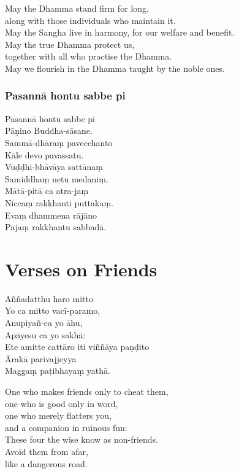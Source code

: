 \begin{english}
  May the Dhamma stand firm for long,\\
  along with those individuals who maintain it.\\
  May the Sangha live in harmony, for our welfare and benefit.\\
  May the true Dhamma protect us,\\
  together with all who practise the Dhamma.\\
  May we flourish in the Dhamma taught by the noble ones.
\end{english}

\subsubsection{Pasannā hontu sabbe pi}


Pasannā hontu sabbe pi\\
Pāṇino Buddha-sāsane.\\
Sammā-dhāraṃ pavecchanto\\
Kāle devo pavassatu.\\
Vuḍḍhi-bhāvāya sattānaṃ\\
Samiddhaṃ netu medaniṃ.\\
Mātā-pitā ca atra-jaṃ\\
Niccaṃ rakkhanti puttakaṃ.\\
Evaṃ dhammena rājāno\\
Pajaṃ rakkhantu sabbadā.

\section{Verses on Friends}


Aññadatthu haro mitto\\
Yo ca mitto vacī-paramo,\\
Anupiyañ-ca yo āhu,\\
Apāyesu ca yo sakhā:\\
Ete amitte cattāro iti viññāya paṇḍito\\
Ārakā parivajjeyya\\
Maggaṃ paṭibhayaṃ yathā.\\

\begin{english}
  One who makes friends only to cheat them,\\
  one who is good only in word,\\
  one who merely flatters you,\\
  and a companion in ruinous fun:\\
  These four the wise know as non-friends.\\
  Avoid them from afar,\\
  like a dangerous road.
\end{english}

